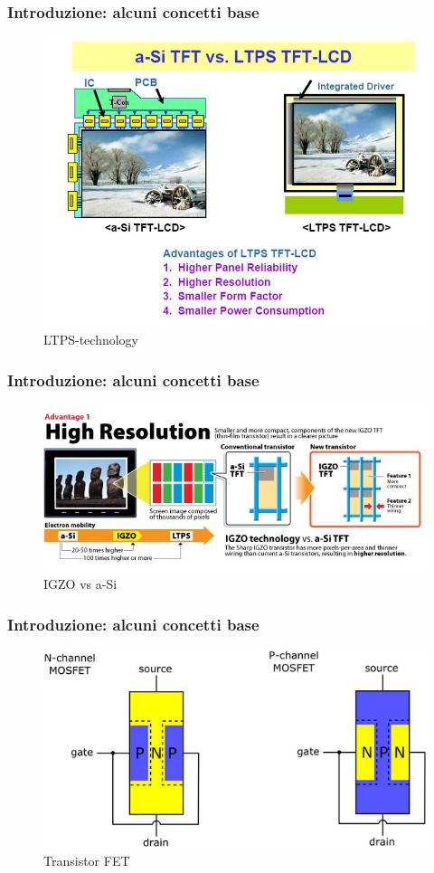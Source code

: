 \documentclass[12pt]{beamer}
\begin{document}
	\begin{frame}
		\frametitle{Introduzione: alcuni concetti base}
		\begin{figure}
			\centering
			\includegraphics[width=1\linewidth]{IMMAGINI/ltps-(technology)}
			\caption{LTPS-technology}
			\label{fig:ltps-technology}
		\end{figure}
	\end{frame}
	\begin{frame}
		\frametitle{Introduzione: alcuni concetti base}
		\begin{figure}
			\centering
			\includegraphics[width=1\linewidth]{IMMAGINI/IGZO-vs-aSi-1}
			\caption{IGZO vs a-Si}
			\label{fig:igzo-vs-asi-1}
		\end{figure}
	\end{frame}
	\begin{frame}
		\frametitle{Introduzione: alcuni concetti base}
		\begin{figure}
			\centering
			\includegraphics[width=1\linewidth]{IMMAGINI/FET_DET}
			\caption{Transistor FET}
			\label{fig:fetdet}
		\end{figure}
	\end{frame}
\end{document}
